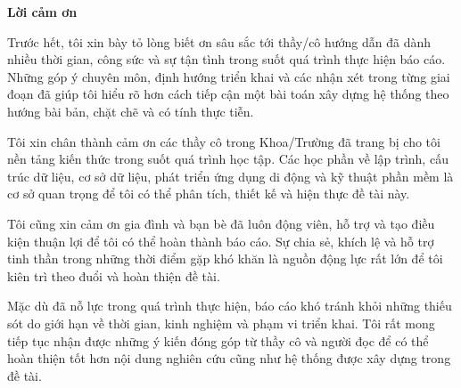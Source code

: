\begin{center}
\textbf{\large{Lời cảm ơn}}
\end{center}

Trước hết, tôi xin bày tỏ lòng biết ơn sâu sắc tới thầy/cô hướng dẫn đã dành nhiều thời gian, công sức và sự tận tình trong suốt quá trình thực hiện báo cáo. Những góp ý chuyên môn, định hướng triển khai và các nhận xét trong từng giai đoạn đã giúp tôi hiểu rõ hơn cách tiếp cận một bài toán xây dựng hệ thống theo hướng bài bản, chặt chẽ và có tính thực tiễn.

Tôi xin chân thành cảm ơn các thầy cô trong Khoa/Trường đã trang bị cho tôi nền tảng kiến thức trong suốt quá trình học tập. Các học phần về lập trình, cấu trúc dữ liệu, cơ sở dữ liệu, phát triển ứng dụng di động và kỹ thuật phần mềm là cơ sở quan trọng để tôi có thể phân tích, thiết kế và hiện thực đề tài này.

Tôi cũng xin cảm ơn gia đình và bạn bè đã luôn động viên, hỗ trợ và tạo điều kiện thuận lợi để tôi có thể hoàn thành báo cáo. Sự chia sẻ, khích lệ và hỗ trợ tinh thần trong những thời điểm gặp khó khăn là nguồn động lực rất lớn để tôi kiên trì theo đuổi và hoàn thiện đề tài.

Mặc dù đã nỗ lực trong quá trình thực hiện, báo cáo khó tránh khỏi những thiếu sót do giới hạn về thời gian, kinh nghiệm và phạm vi triển khai. Tôi rất mong tiếp tục nhận được những ý kiến đóng góp từ thầy cô và người đọc để có thể hoàn thiện tốt hơn nội dung nghiên cứu cũng như hệ thống được xây dựng trong đề tài.
